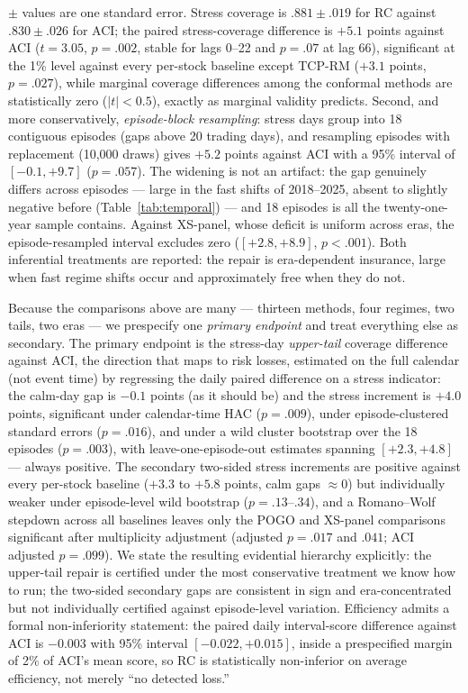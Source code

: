 $\pm$ values are one standard error. Stress coverage is
$.881 \pm .019$ for RC against $.830 \pm .026$ for ACI; the paired
stress-coverage difference is $+5.1$ points against ACI ($t = 3.05$,
$p = .002$, stable for lags 0--22 and $p = .07$ at lag 66), significant
at the 1\% level against every per-stock baseline except TCP-RM ($+3.1$
points, $p = .027$), while marginal coverage differences among the
conformal methods are statistically zero ($|t| < 0.5$), exactly as
marginal validity predicts. Second, and more conservatively,
\emph{episode-block resampling}: stress days group into 18 contiguous
episodes (gaps above 20 trading days), and resampling episodes with
replacement (10{,}000 draws) gives $+5.2$ points against ACI with a
95\% interval of $[-0.1, +9.7]$ ($p = .057$). The widening is not an
artifact: the gap genuinely differs across episodes --- large in the
fast shifts of 2018--2025, absent to slightly negative before
(Table~\ref{tab:temporal}) --- and 18 episodes is all the
twenty-one-year sample contains. Against XS-panel, whose deficit is
uniform across eras, the episode-resampled interval excludes zero
($[+2.8, +8.9]$, $p < .001$). Both inferential treatments are reported: the repair is
era-dependent insurance, large when fast regime shifts occur and
approximately free when they do not.

Because the comparisons above are many --- thirteen methods, four
regimes, two tails, two eras --- we prespecify one \emph{primary
endpoint} and treat everything else as secondary. The primary endpoint
is the stress-day \emph{upper-tail} coverage difference against ACI,
the direction that maps to risk losses, estimated on the full calendar
(not event time) by regressing the daily paired difference on a stress
indicator: the calm-day gap is $-0.1$ points (as it should be) and the
stress increment is $+4.0$ points, significant under calendar-time HAC
($p = .009$), under episode-clustered standard errors ($p = .016$), and
under a wild cluster bootstrap over the 18 episodes ($p = .003$), with
leave-one-episode-out estimates spanning $[+2.3, +4.8]$ --- always
positive. The secondary two-sided stress increments are positive
against every per-stock baseline ($+3.3$ to $+5.8$ points, calm gaps
$\approx 0$) but individually weaker under episode-level wild
bootstrap ($p = .13$--$.34$), and a Romano--Wolf stepdown across all
baselines leaves only the POGO and XS-panel comparisons significant
after multiplicity adjustment (adjusted $p = .017$ and $.041$; ACI
adjusted $p = .099$). We state the resulting evidential hierarchy
explicitly: the upper-tail repair is certified under the most
conservative treatment we know how to run; the two-sided secondary
gaps are consistent in sign and era-concentrated but not individually
certified against episode-level variation. Efficiency admits a formal
non-inferiority statement: the paired daily interval-score difference
against ACI is $-0.003$ with 95\% interval $[-0.022, +0.015]$, inside
a prespecified margin of 2\% of ACI's mean score, so RC is
statistically non-inferior on average efficiency, not merely
``no detected loss.''

